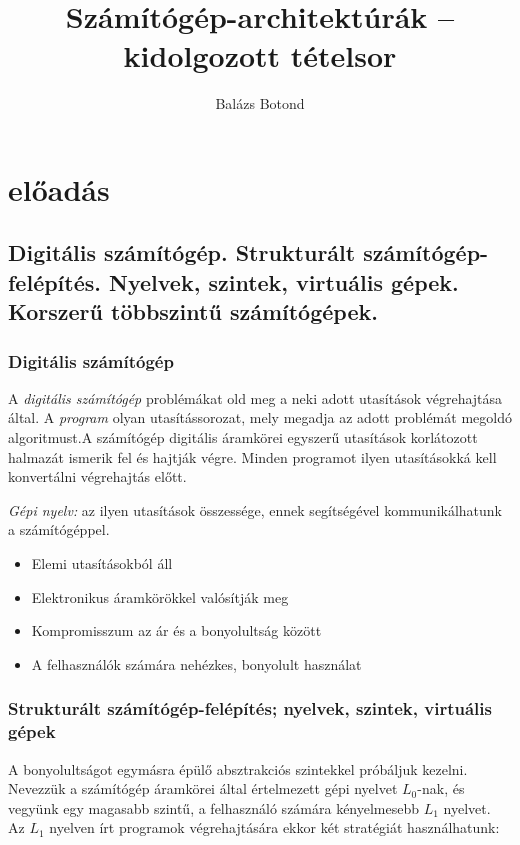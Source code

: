\documentclass[a4paper]{article}
\title{Számítógép-architektúrák -- kidolgozott tételsor}
\author{Balázs Botond}
\begin{document}
\maketitle

\section{előadás}

\subsection{Digitális számítógép. Strukturált számítógép-felépítés. Nyelvek, szintek, virtuális gépek. Korszerű többszintű számítógépek.}

\subsubsection{Digitális számítógép}

A \emph{digitális számítógép} problémákat old meg a neki adott utasítások végrehajtása által. A \textit{program} olyan utasítássorozat, mely megadja az adott problémát megoldó algoritmust.A számítógép digitális áramkörei egyszerű utasítások korlátozott halmazát ismerik fel és hajtják végre. Minden programot ilyen utasításokká kell konvertálni végrehajtás előtt.

\textit{Gépi nyelv:} az ilyen utasítások összessége, ennek segítségével kommunikálhatunk a számítógéppel.

\begin{itemize}
	\item Elemi utasításokból áll
	\item Elektronikus áramkörökkel valósítják meg
	\item Kompromisszum az ár és a bonyolultság között
	\item A felhasználók számára nehézkes, bonyolult használat
\end{itemize}

\subsubsection{Strukturált számítógép-felépítés; nyelvek, szintek, virtuális gépek}

A bonyolultságot egymásra épülő absztrakciós szintekkel próbáljuk kezelni. Nevezzük a számítógép áramkörei által értelmezett gépi nyelvet $L_0$-nak, és vegyünk egy magasabb szintű, a felhasználó számára kényelmesebb $L_1$ nyelvet. Az $L_1$ nyelven írt programok végrehajtására ekkor két stratégiát használhatunk:
\end{document}
